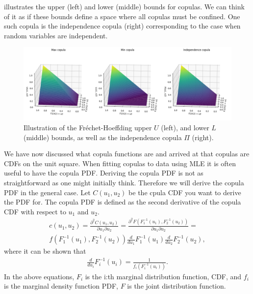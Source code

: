  illustrates the upper (left) and lower (middle) bounds for copulas. We can think of it as if these bounds define a space where all copulas must be confined. One such copula is the independence copula (right) corresponding to the case when random variables are independent. 

\begin{figure}
    \centering
    \includegraphics[width=1.\linewidth]{3Theory/pictures/FrechetBounds.png}
    \caption{Illustration of the Fréchet-Hoeffding upper $U$ (left), and lower $L$ (middle) bounds, as well as the independence copula $\Pi$ (right).}
    \label{fig:FrechetBounds}
\end{figure}

We have now discussed what copula functions are and arrived at that copulas are \gls{CDF}s on the unit square. When fitting copulas to data using \gls{MLE} it is often useful to have the copula \gls{PDF}. Deriving the copula \gls{PDF} is not as straightforward as one might initially think. Therefore we will derive the copula \gls{PDF} in the general case. Let $C(u_1,u_2)$ be the cpula \gls{CDF} you want to derive the \gls{PDF} for. The copula \gls{PDF} is defined as the second derivative of the copula \gls{CDF} with respect to $u_1$ and $u_2$.
\begin{align*}
    c(u_1,u_2) = \frac{\partial^2C(u_1,u_2)}{\partial u_1\partial u_2} = 
    \frac{\partial^2F(F_1^{-1}(u_1),F_2^{-1}(u_2))}{\partial u_1\partial u_2}
    = \\ f(F_1^{-1}(u_1),F_2^{-1}(u_2)) \frac{d}{du_1} F_1^{-1}(u_1)  \frac{d}{du_2} F_2^{-1}(u_2),
\end{align*}
where it can be shown that 
\begin{align*}
    \frac{d}{du_i} F_i^{-1}(u_i) = \frac{1}{f_i(F_i^{-1}(u_i))}.
\end{align*}
In the above equations, $F_i$ is the i:th marginal distribution function, \gls{CDF}, and $f_i$ is the marginal density function \gls{PDF}, $F$ is the joint distribution function.   

